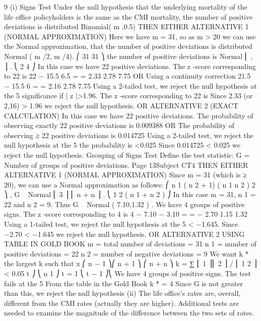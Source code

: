 9
(i)
Signs Test
Under the null hypothesis that the underlying mortality of the life office policyholders
is the same as the CMI mortality,
the number of positive deviations is distributed Binomial( m ,0.5)
THEN EITHER ALTERNATIVE 1 (NORMAL APPROXIMATION)
Here we have m = 31, so as m > 20 we can use the Normal approximation, that the
number of positive deviations is distributed Normal ( m /2, m /4).
⎛ 31 31 ⎞
the number of positive deviations is Normal ⎜ , ⎟ .
⎝ 2 4 ⎠
In this case we have 22 positive deviations.
The z -score corresponding to 22 is
22 − 15.5 6.5
=
= 2.33
2.78
7.75
OR Using a continuity correction
21.5 − 15.5
6
=
= 2.16
2.78
7.75
Using a 2-tailed test, we reject the null hypothesis at the 5%
significance if | z |>1.96.
The z -score corresponding to 22 is
Since 2.33 (or 2,16) > 1.96 we reject the null hypothesis.
OR ALTERNATIVE 2 (EXACT CALCULATION)
In this case we have 22 positive deviations.
The probability of observing exactly 22 positive deviations is 0.009388
OR
The probability of observing ≥ 22 positive deviations is 0.014725
Using a 2-tailed test, we reject the null hypothesis at the 5%
the probability is <0.025
Since 0.014725 < 0.025 we reject the null hypothesis.
Grouping of Signs Test
Define the test statistic:
G = Number of groups of positive deviations.
Page 13Subject CT4 %
THEN EITHER ALTERNATIVE 1 (NORMAL APPROXIMATION)
Since m = 31 (which is ≥ 20), we can use a Normal approximation as follows:
⎛ n 1 ( n 2 + 1) ( n 1 n 2 ) 2 ⎞
,
G ~ Normal ⎜
3 ⎟
⎜ n + n
⎟ .
⎝ 1 2 ( n 1 + n 2 ) ⎠
In this case m = 31, n 1 = 22 and n 2 = 9.
Thus G ~ Normal ( 7.10,1.32 ) .
We have 4 groups of positive signs.
The z -score corresponding to 4 is
4 − 7.10 − 3.10
=
= − 2.70
1.15
1.32
Using a 1-tailed test, we reject the null hypothesis at the 5%
< −1.645.
Since −2.70 < −1.645 we reject the null hypothesis.
OR ALTERNATIVE 2 USING TABLE IN GOLD BOOK
m = total number of deviations = 31
n 1 = number of positive deviations = 22
n 2 = number of negative deviations = 9
We want k * the largest k such that
x
⎛ n − 1 ⎞⎛ n + 1 ⎞ ⎛ n + n ⎞
k = ∑ ⎜ 1 ⎟⎜ 2 ⎟ / ⎜ 1 2 ⎟ < 0.05
t ⎠ ⎝ n 1 ⎠
t = 1 ⎝ t − 1 ⎠⎝
We have 4 groups of positive signs.
The test fails at the 5%
From the table in the Gold Book k * = 4
Since G is not greater than this, we reject the null hypothesis
(ii)
The life office’s rates are, overall, different from the CMI rates (actually they are
higher).
Additional tests are needed to examine the magnitude of the difference between the
two sets of rates.
